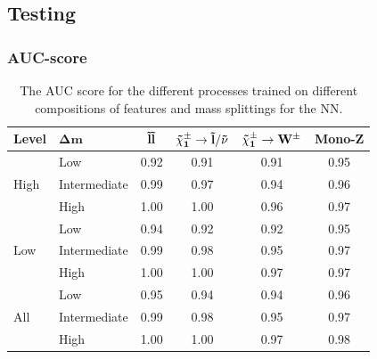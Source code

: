 \subsection{Testing}












\subsubsection{AUC-score}

\begin{table}[H]
    \centering
    \renewcommand{\arraystretch}{1.}
    \begin{tabular}{l l c c c c }
    \toprule
    \textbf{Level} & $\mathbf{\Delta m}$ & $\mathbf{\Tilde{l} \Tilde{l}}$ & $\mathbf{\Tilde{\chi}_1^\pm \rightarrow \Tilde{l}/\Tilde{\nu}}$ & $\mathbf{\Tilde{\chi}_1^\pm \rightarrow W^\pm}$ & \textbf{Mono-Z}  \\
    \midrule
    \midrule
    \multirow{3}{*}{High} &  Low   & 0.92 & 0.91 & 0.91 & 0.95 \\
     & Intermediate & 0.99 & 0.97 & 0.94 & 0.96 \\
     & High & 1.00 & 1.00 & 0.96 & 0.97 \\
     \midrule
    \multirow{3}{*}{Low} & Low & 0.94 & 0.92 & 0.92 & 0.95 \\
     & Intermediate & 0.99 & 0.98 & 0.95 & 0.97 \\
     & High & 1.00 & 1.00 & 0.97 & 0.97 \\
     \midrule
    \multirow{3}{*}{All} & Low & 0.95 & 0.94 & 0.94 & 0.96 \\
     & Intermediate & 0.99 & 0.98 & 0.95 & 0.97 \\
     & High & 1.00 & 1.00 & 0.97 & 0.98 \\
     \bottomrule
    \end{tabular}
    \caption{The AUC score for the different processes trained on different compositions of features and mass splittings for the NN.}
    \label{tab:AUCNN}
\end{table}






